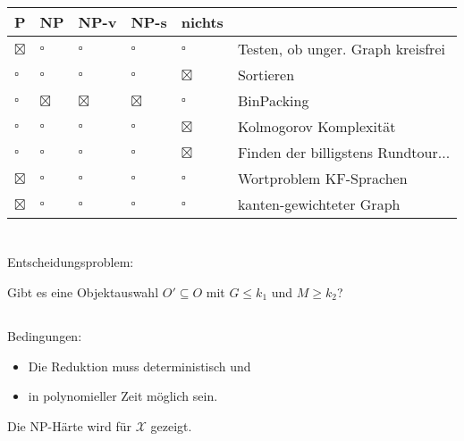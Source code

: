 \documentclass{article}
\begin{document}
\section{}
\begin{center}
\begin{tabularx}{\textwidth}{lllll|X}
P & NP & NP-v & NP-s & nichts & \\
\hline
$\boxtimes$ & $\square$ & $\square$ & $\square$ & $\square$ & Testen, ob unger. Graph kreisfrei \\
$\square$ & $\square$ & $\square$ & $\square$ & $\boxtimes$ & Sortieren\\
$\square$ & $\boxtimes$ & $\boxtimes$ & $\boxtimes$ & $\square$ & BinPacking\\
$\square$ & $\square$ & $\square$ & $\square$ & $\boxtimes$ & Kolmogorov Komplexität\\
$\square$ & $\square$ & $\square$ & $\square$ & $\boxtimes$ & Finden der billigstens Rundtour...\\
$\boxtimes$ & $\square$ & $\square$ & $\square$ & $\square$ & Wortproblem KF-Sprachen \\
$\boxtimes$ & $\square$ & $\square$ & $\square$ & $\square$ & kanten-gewichteter Graph \\
\end{tabularx}
\end{center}

\section{}
\subsection{}
Entscheidungsproblem:

Gibt es eine Objektauswahl $O'\subseteq O$ mit $G \leq k_1$ und $M \geq k_2$?

\subsection{}
Bedingungen:
\begin{itemize}
  \item Die Reduktion muss deterministisch und
  \item in polynomieller Zeit möglich sein.
\end{itemize}
Die NP-Härte wird für $\mathcal{X}$ gezeigt.
\end{document}
